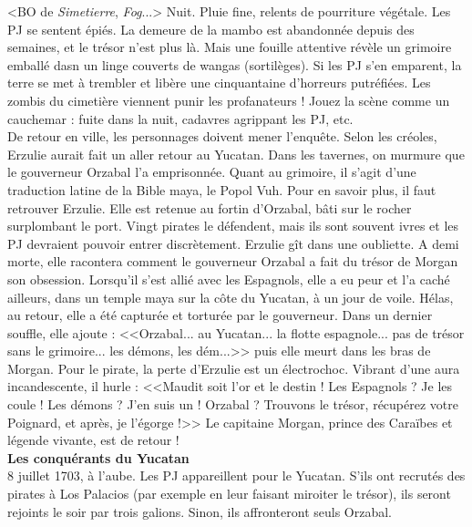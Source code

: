 \documentclass[11pt,twoside,a4paper]{book}
\begin{document}
<BO de \emph{Simetierre}, \emph{Fog}...> Nuit. Pluie fine, relents de pourriture v{\'e}g{\'e}tale. Les PJ se sentent {\'e}pi{\'e}s. La demeure de la mambo est abandonn{\'e}e depuis des semaines, et le tr{\'e}sor n'est plus l{\`a}. Mais une fouille attentive r{\'e}v{\`e}le un grimoire emball{\'e} dasn un linge couverts de wangas (sortil{\`e}ges). Si les PJ s'en emparent, la terre se met {\`a} trembler et lib{\`e}re une cinquantaine d'horreurs putr{\'e}fi{\'e}es. Les zombis du cimeti{\`e}re viennent punir les profanateurs ! Jouez la sc{\`e}ne comme un cauchemar : fuite dans la nuit, cadavres agrippant les PJ, etc.~\\

De retour en ville, les personnages doivent mener l'enqu{\^e}te. Selon les cr{\'e}oles, Erzulie aurait fait un aller retour au Yucatan. Dans les tavernes, on murmure que le gouverneur Orzabal l'a emprisonn{\'e}e. Quant au grimoire, il s'agit d'une traduction latine de la Bible maya, le Popol Vuh. Pour en savoir plus, il faut retrouver Erzulie. Elle est retenue au fortin d'Orzabal, b{\^a}ti sur le rocher surplombant le port. Vingt pirates le d{\'e}fendent, mais ils sont souvent ivres et les PJ devraient pouvoir entrer discr{\`e}tement. Erzulie g{\^i}t dans une oubliette. A demi morte, elle racontera comment le gouverneur Orzabal a fait du tr{\'e}sor de Morgan son obsession. Lorsqu'il s'est alli{\'e} avec les Espagnols, elle a eu peur et l'a cach{\'e} ailleurs, dans un temple maya sur la c{\^o}te du Yucatan, {\`a} un jour de voile. H{\'e}las, au retour, elle a {\'e}t{\'e} captur{\'e}e et tortur{\'e}e par le gouverneur. Dans un dernier souffle, elle ajoute : <<Orzabal... au Yucatan... la flotte espagnole... pas de tr{\'e}sor sans le grimoire... les d{\'e}mons, les d{\'e}m...>> puis elle meurt dans les bras de Morgan. Pour le pirate, la perte d'Erzulie est un {\'e}lectrochoc. Vibrant d'une aura incandescente, il hurle : <<Maudit soit l'or et le destin ! Les Espagnols ? Je les coule ! Les d{\'e}mons ? J'en suis un ! Orzabal ? Trouvons le tr{\'e}sor, r{\'e}cup{\'e}rez votre Poignard, et apr{\`e}s, je l'{\'e}gorge !>> Le capitaine Morgan, prince des Cara{\"i}bes et l{\'e}gende vivante, est de retour !~\\

\textbf{\large Les conqu{\'e}rants du Yucatan}~\\

8 juillet 1703, {\`a} l'aube. Les PJ appareillent pour le Yucatan. S'ils ont recrut{\'e}s des pirates {\`a} Los Palacios (par exemple en leur faisant miroiter le tr{\'e}sor), ils seront rejoints le soir par trois galions. Sinon, ils affronteront seuls Orzabal.~\\
\end{document}
